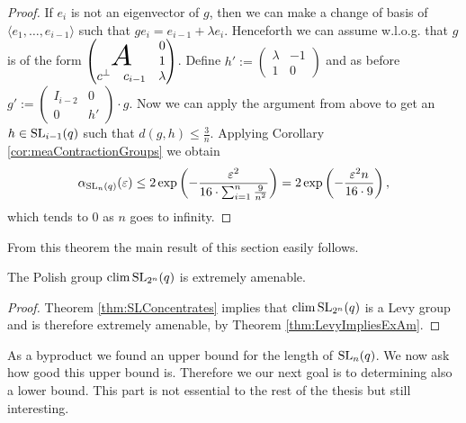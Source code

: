 \begin{proof}
If $e_i$ is not an eigenvector of $g$, then we can make a change of basis of $\langle e_1,\dots,e_{i-1}\rangle$ such that $ge_i=e_{i-1}+\lambda e_i$. Henceforth we can assume w.l.o.g. that $g$ is of the form 
$\begin{pmatrix}
&&0\\
\multicolumn{2}{c}
      {\raisebox{\dimexpr\normalbaselineskip+.2\ht\strutbox-0.9\height}[0pt][0pt]
        {\scalebox{2.3}{$A$}}} &1\\
c^\bot&c_{i-1}&\lambda
\end{pmatrix}
$.
Define $h':=
\begin{pmatrix}
\lambda&-1\\
1&0
\end{pmatrix}
$ and as before $g':=
\begin{pmatrix}
I_{i-2}&0\\
0&h'
\end{pmatrix}\cdot g$.
Now we can apply the argument from above to get an $h\in \operatorname{SL}_{i-1}(q)$ such that $d(g,h)\leq\frac{3}{n}$. Applying Corollary \ref{cor:meaContractionGroups} we obtain
\[\alpha_{\operatorname{SL}_n(q)}(\varepsilon)\leq 2\exp\left(-\frac{\varepsilon^2}{16\cdot\sum_{i=1}^{n}\frac{9}{n^2}}\right)=2\exp\left(-\frac{\varepsilon^2 n}{16\cdot9}\right),\]
which tends to 0 as $n$ goes to infinity. 

\end{proof}

From this theorem the main result of this section easily follows.

\begin{corollary}
The Polish group $\operatorname{clim} \operatorname{SL}_{2^n}(q)$ is extremely amenable.
\end{corollary}
\begin{proof}
Theorem \ref{thm:SLConcentrates} implies that $\operatorname{clim} \operatorname{SL}_{2^n}(q)$ is a Levy group and is therefore extremely amenable, by Theorem \ref{thm:LevyImpliesExAm}.
\end{proof}

As a byproduct we found an upper bound for the length of $\operatorname{SL}_n(q)$. We now ask how good this upper bound is. Therefore we our next goal is to determining also a lower bound. This part is not essential to the rest of the thesis but still interesting.

